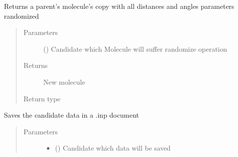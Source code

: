 \documentclass[letterpaper,10pt,english]{sphinxmanual}
\begin{document}
\begin{fulllineitems}
\begin{fulllineitems}
\label{\detokenize{MolOpt:MolOpt.MolOpt.MolOpt.randomize}}
\sphinxAtStartPar
Returns a parent’s molecule’s copy with all distances and angles parameters randomized
\begin{quote}\begin{description}
\item[{Parameters}] \leavevmode
\sphinxAtStartPar
{} ({\hyperref[\detokenize{MolOpt.genetic:MolOpt.genetic.genetic.Chromosome}]{}}) \textendash{} Candidate which Molecule will suffer randomize operation

\item[{Returns}] \leavevmode
\sphinxAtStartPar
New molecule

\item[{Return type}] \leavevmode
\sphinxAtStartPar
{\hyperref[\detokenize{MolOpt.molecular:MolOpt.molecular.molecular.Molecule}]{}}

\end{description}\end{quote}

\end{fulllineitems}


\begin{fulllineitems}
\label{\detokenize{MolOpt:MolOpt.MolOpt.MolOpt.save}}
\sphinxAtStartPar
Saves the candidate data in a .inp document
\begin{quote}\begin{description}
\item[{Parameters}] \leavevmode\begin{itemize}
\item {} 
\sphinxAtStartPar
{} ({\hyperref[\detokenize{MolOpt.genetic:MolOpt.genetic.genetic.Chromosome}]{}}) \textendash{} Candidate which data will be saved


\end{itemize}
\end{description}
\end{quote}
\end{fulllineitems}
\end{fulllineitems}
\end{document}
